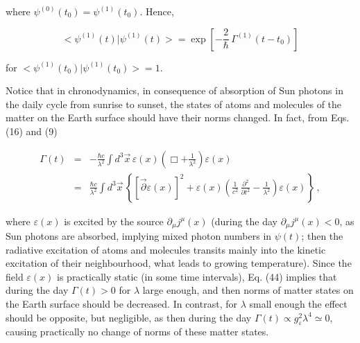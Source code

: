 \documentclass[a4paper,12pt]{article}
\begin{document}
\vspace{0.15cm}

\ni where $\psi^{(0)}(t_0) = \psi^{(1)}(t_0)$. Hence,

\begin{equation}
<\!\psi^{(1)}(t) | \psi^{(1)}(t)\!> = \exp \left[-\frac{2}{\hbar}\, \Gamma^{(1)}(t - t_0) \right]
\end{equation}

\vspace{0.15cm}

\ni for $<\!\psi^{(1)}(t_0)|\psi^{(1)}(t_0)\!> = 1$. 

\vspace{0.2cm}


\vspace{0.2cm}

Notice that in chronodynamics, in consequence of absorption of Sun photons in the daily cycle from sunrise to sunset, the states of atoms and molecules of the matter on the Earth surface should have their norms changed. In fact, from Eqs. (16) and (9)

\begin{eqnarray}
\Gamma(t) & = & - \frac{\hbar c}{\lambda^2} \int d^3\vec{x}\, \varepsilon(x)\left(\Box + \frac{1}{\lambda^2}\right) \varepsilon(x) \nonumber \\ & = &  \frac{\hbar c}{\lambda^2} \int d^3\vec{x}\, \left\{\left[\vec{\partial} \varepsilon(x)\right]^2 + \varepsilon(x) \left( \frac{1}{c^2}\, \frac{\partial^2}{\partial t^2} - \frac{1}{\lambda^2}\right) \varepsilon(x)\right\} \,,
\end{eqnarray} 

\vspace{0.15cm}

\ni where $\varepsilon(x)$ is excited by the source $\partial_\mu j^\mu(x)$ (during the day $\partial_\mu j^\mu(x) < 0$, as Sun photons are absorbed, implying mixed photon numbers in $\psi(t)$; then the radiative excitation of atoms and molecules transits mainly into the kinetic excitation of their neighbourhood, what leads to growing temperature). Since the field  $\varepsilon(x)$ is practically static (in some time intervals), Eq. (44) implies that during the day $\Gamma(t) > 0$ for $\lambda$ large enough, and then norms of matter states on the Earth surface should be decreased. In contrast,  for $\lambda$ small enough the effect should be opposite, but negligible, as then during the day $\Gamma(t) \propto g^2_\varepsilon \lambda^4 \simeq 0$, causing practically no change of norms of these matter states.
\end{document}
